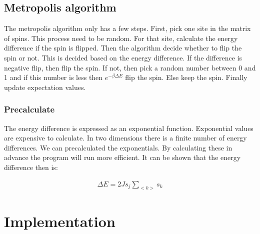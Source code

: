 
\subsection{Metropolis algorithm}\label{sec:metro}

The metropolis algorithm only has a few steps. First, pick one site in the matrix of spins. This process need to be random. For that site, calculate the energy difference if the spin is flipped. Then the algorithm decide whether to flip the spin or not. This is decided based on the energy difference. If the difference is negative flip, then flip the spin. If not, then pick a random number between 0 and 1 and if this number is less then $e^{-\beta \Delta E}$ flip the spin. Else keep the spin. Finally update expectation values.


\subsubsection{Precalculate}

The energy difference is expressed as an exponential function. Exponential values are expensive to calculate. In two dimensions there is a finite number of energy differences. We can precalculated the exponentials. By calculating these in advance the program will run more efficient. It can be shown that the energy difference then is:

\begin{align*}
	\Delta E = 2J s_j \sum_{<k>} s_k
\end{align*}







\pagebreak
\section{Implementation}


